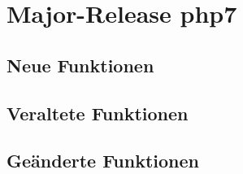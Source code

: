 \chapter{Major-Release php7}\label{ch:php7}

\section{Neue Funktionen}


\section{Veraltete Funktionen}

\section{Geänderte Funktionen}
